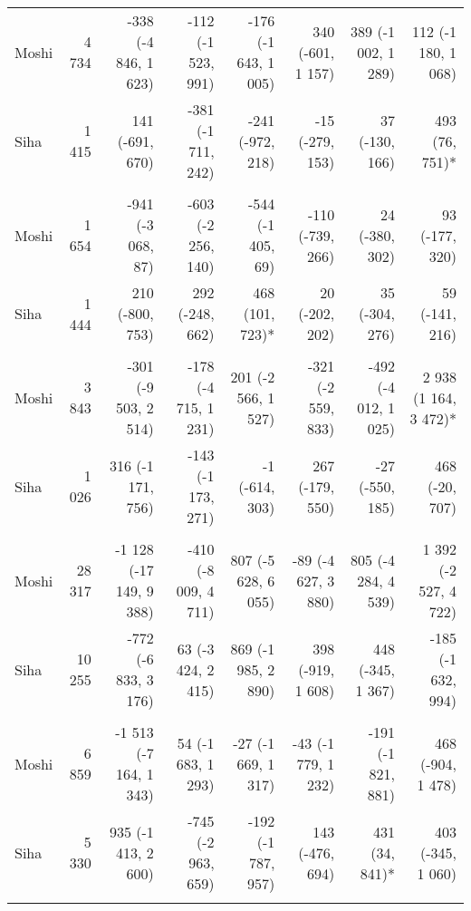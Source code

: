 \begin{table}[t]
\begin{tabular*}{\linewidth}{@{\extracolsep{\fill}}l|rrrrrrr}
\midrule\addlinespace[2.5pt]
\multicolumn{8}{l}{Poisoning} \\[2.5pt] 
\midrule\addlinespace[2.5pt]
Moshi & 4 734 & -338 (-4 846, 1 623)  & -112 (-1 523, 991)  & -176 (-1 643, 1 005)  & 340 (-601, 1 157)  & 389 (-1 002, 1 289)  & 112 (-1 180, 1 068)  \\ 
Siha & 1 415 & 141 (-691, 670)  & -381 (-1 711, 242)  & -241 (-972, 218)  & -15 (-279, 153)  & 37 (-130, 166)  & 493 (76, 751)* \\ 
\midrule\addlinespace[2.5pt]
\multicolumn{8}{l}{Snake and Insect Bites} \\[2.5pt] 
\midrule\addlinespace[2.5pt]
Moshi & 1 654 & -941 (-3 068, 87)  & -603 (-2 256, 140)  & -544 (-1 405, 69)  & -110 (-739, 266)  & 24 (-380, 302)  & 93 (-177, 320)  \\ 
Siha & 1 444 & 210 (-800, 753)  & 292 (-248, 662)  & 468 (101, 723)* & 20 (-202, 202)  & 35 (-304, 276)  & 59 (-141, 216)  \\ 
\midrule\addlinespace[2.5pt]
\multicolumn{8}{l}{Substance Abuse} \\[2.5pt] 
\midrule\addlinespace[2.5pt]
Moshi & 3 843 & -301 (-9 503, 2 514)  & -178 (-4 715, 1 231)  & 201 (-2 566, 1 527)  & -321 (-2 559, 833)  & -492 (-4 012, 1 025)  & 2 938 (1 164, 3 472)* \\ 
Siha & 1 026 & 316 (-1 171, 756)  & -143 (-1 173, 271)  & -1 (-614, 303)  & 267 (-179, 550)  & -27 (-550, 185)  & 468 (-20, 707)  \\ 
\midrule\addlinespace[2.5pt]
\multicolumn{8}{l}{Fractures} \\[2.5pt] 
\midrule\addlinespace[2.5pt]
Moshi & 28 317 & -1 128 (-17 149, 9 388)  & -410 (-8 009, 4 711)  & 807 (-5 628, 6 055)  & -89 (-4 627, 3 880)  & 805 (-4 284, 4 539)  & 1 392 (-2 527, 4 722)  \\ 
Siha & 10 255 & -772 (-6 833, 3 176)  & 63 (-3 424, 2 415)  & 869 (-1 985, 2 890)  & 398 (-919, 1 608)  & 448 (-345, 1 367)  & -185 (-1 632, 994)  \\ 
\midrule\addlinespace[2.5pt]
\multicolumn{8}{l}{Road Traffic Accidents} \\[2.5pt] 
\midrule\addlinespace[2.5pt]
Moshi & 6 859 & -1 513 (-7 164, 1 343)  & 54 (-1 683, 1 293)  & -27 (-1 669, 1 317)  & -43 (-1 779, 1 232)  & -191 (-1 821, 881)  & 468 (-904, 1 478)  \\ 
Siha & 5 330 & 935 (-1 413, 2 600)  & -745 (-2 963, 659)  & -192 (-1 787, 957)  & 143 (-476, 694)  & 431 (34, 841)* & 403 (-345, 1 060)  \\ 
\midrule\addlinespace[2.5pt]

\end{tabular*}
\end{table}
